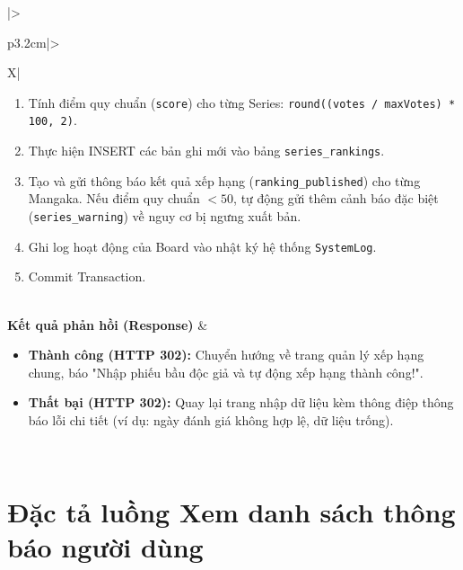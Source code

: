 \begin{table}[H]
\begin{tabularx}{\textwidth}{|>{\raggedright\arraybackslash\bfseries}p{3.2cm}|>{\raggedright\arraybackslash}X|}
\begin{minipage}[t]{\linewidth}
\begin{enumerate}[leftmargin=*]
        \item Tính điểm quy chuẩn (\texttt{score}) cho từng Series: \texttt{round((votes / maxVotes) * 100, 2)}.
        \item Thực hiện INSERT các bản ghi mới vào bảng \texttt{series\_rankings}.
        \item Tạo và gửi thông báo kết quả xếp hạng (\texttt{ranking\_published}) cho từng Mangaka. Nếu điểm quy chuẩn $< 50$, tự động gửi thêm cảnh báo đặc biệt (\texttt{series\_warning}) về nguy cơ bị ngưng xuất bản.
        \item Ghi log hoạt động của Board vào nhật ký hệ thống \texttt{SystemLog}.
        \item Commit Transaction.
    \end{enumerate}
\end{minipage} \\ \hline
\textbf{Kết quả phản hồi (Response)} & 
\begin{minipage}[t]{\linewidth}
    \begin{itemize}[leftmargin=*]
        \item \textbf{Thành công (HTTP 302):} Chuyển hướng về trang quản lý xếp hạng chung, báo "Nhập phiếu bầu độc giả và tự động xếp hạng thành công!".
        \item \textbf{Thất bại (HTTP 302):} Quay lại trang nhập dữ liệu kèm thông điệp thông báo lỗi chi tiết (ví dụ: ngày đánh giá không hợp lệ, dữ liệu trống).
    \end{itemize}
\end{minipage} \\ \hline
\end{tabularx}
\caption{Đặc tả yêu cầu cập nhật phiếu bầu và xếp hạng}
\label{tab:api_ranking_store}
\end{table}

\newpage

\section{Đặc tả luồng Xem danh sách thông báo người dùng}
\label{sec:api_notification_index}


